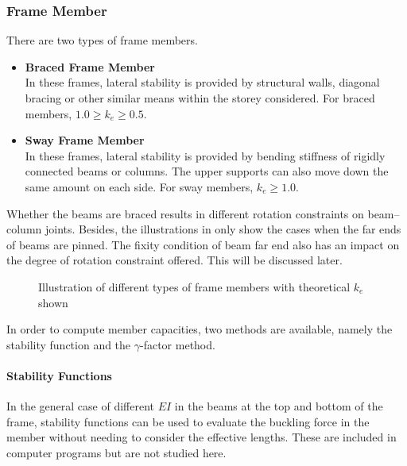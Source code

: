 \subsubsection{Frame Member}
There are two types of frame members.
\begin{itemize}
\item \textbf{Braced Frame Member}\\
In these frames, lateral stability is provided by structural walls, diagonal bracing or other similar means within the storey considered. For braced members, $1.0\geqslant{}k_e\geqslant{}0.5$.
\item \textbf{Sway Frame Member}\\
In these frames, lateral stability is provided by bending stiffness of rigidly connected beams or columns. The upper supports can also move down the same amount on each side. For sway members, $k_e\geqslant{}1.0$.
\end{itemize}

Whether the beams are braced results in different rotation constraints on beam--column joints. Besides, the illustrations in  only show the cases when the far ends of beams are pinned. The fixity condition of beam far end also has an impact on the degree of rotation constraint offered. This will be discussed later.
\begin{figure}[ht!]
\centering

\caption{Illustration of different types of frame members with theoretical $k_e$ shown}\label{fig:fm}
\end{figure}

In order to compute member capacities, two methods are available, namely the stability function and the $\gamma$-factor method.
\paragraph{Stability Functions}
In the general case of different $EI$ in the beams at the top and bottom of the frame, stability functions can be used to evaluate the buckling force in the member without needing to consider the effective lengths. These are included in computer programs but are not studied here.
